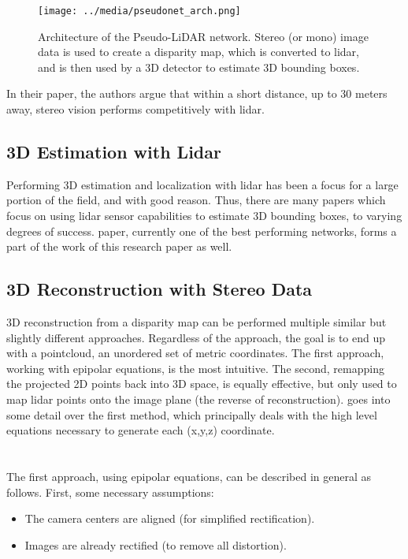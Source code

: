 \begin{figure}[h] %
    \texttt{[image: ../media/pseudonet\_arch.png]}
    \caption{Architecture of the Pseudo-LiDAR network. Stereo (or mono) image data is used to create a disparity map, which is converted to lidar, and is then used by a 3D detector to estimate 3D bounding boxes.}
    \label{pseudonet_arch} %
\end{figure}

In their paper, the authors argue that within a short distance, up to 30 meters away, stereo vision performs competitively with lidar.

\subsection{3D Estimation with Lidar}
Performing 3D estimation and localization with lidar has been a focus for a large portion of the field, and with good reason. Thus, there are many papers which focus on using lidar sensor capabilities to estimate 3D bounding boxes, to varying degrees of success. \cite{qi_frustum_2017} paper, currently one of the best performing networks, forms a part of the work of this research paper as well.

\subsection{3D Reconstruction with Stereo Data}
\label{sect_reconstruct}
3D reconstruction from a disparity map can be performed multiple similar but slightly different approaches. Regardless of the approach, the goal is to end up with a pointcloud, an unordered set of metric coordinates. The first approach, working with epipolar equations, is the most intuitive. The second, remapping the projected 2D points back into 3D space, is equally effective, but only used to map lidar points onto the image plane (the reverse of reconstruction). \cite{szeliski_computer_2010} goes into some detail over the first method, which principally deals with the high level equations necessary to generate each (x,y,z) coordinate.
\\
\\
\\
The first approach, using epipolar equations, can be described in general as follows. First, some necessary assumptions:
\begin{itemize} \itemsep=-0.5em
    \item The camera centers are aligned (for simplified rectification).
    \item Images are already rectified (to remove all distortion).
\end{itemize}

